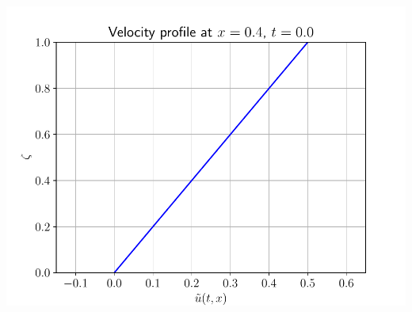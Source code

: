 \documentclass[10pt]{beamer}
\begin{document}
\begin{frame}
        \includegraphics[scale=0.2]{Figures/velocity_profile_0_4_0.pdf}
      \end{frame}
\end{document}
